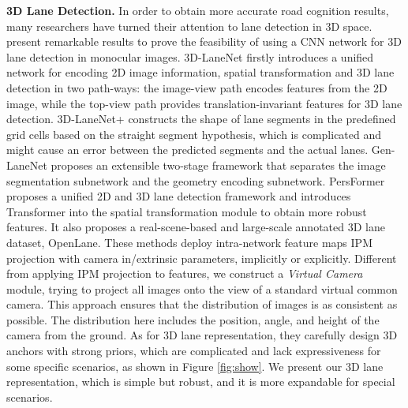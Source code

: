 \documentclass[10pt,twocolumn,letterpaper]{article}
\begin{document}
\textbf{3D Lane Detection.}
In order to obtain more accurate road cognition results, many researchers have turned their attention to lane detection in 3D space. \cite{garnett20193d,guo2020gen,chen2022persformer,li2022reconstruct} present remarkable results to prove the feasibility of using a CNN network for 3D lane detection in monocular images. 3D-LaneNet \cite{garnett20193d} firstly introduces a unified network for encoding 2D image information, spatial transformation and 3D lane detection in two path-ways: the image-view path encodes features from the 2D image, while the top-view path provides translation-invariant features for 3D lane detection. 3D-LaneNet+ \cite{efrat20203d} constructs the shape of lane segments in the predefined grid cells based on the straight segment hypothesis, which is complicated and might cause an error between the predicted segments and the actual lanes. Gen-LaneNet \cite{guo2020gen} proposes an extensible two-stage framework that separates the image segmentation subnetwork and the geometry encoding subnetwork. PersFormer \cite{chen2022persformer} proposes a unified 2D and 3D lane detection framework and introduces Transformer \cite{vaswani2017attention} into the spatial transformation module to obtain more robust features. It also proposes a real-scene-based and large-scale annotated 3D lane dataset, OpenLane. These methods deploy intra-network feature maps IPM projection with camera in/extrinsic parameters, implicitly or explicitly. Different from applying IPM projection to features, we construct a \textit{Virtual Camera} module, trying to project all images onto the view of a standard virtual common camera. This approach ensures that the distribution of images is as consistent as possible. The distribution here includes the position, angle, and height of the camera from the ground. As for 3D lane representation, they carefully design 3D anchors with strong priors, which are complicated and lack expressiveness for some specific scenarios, as shown in Figure \ref{fig:show}. We present our 3D lane representation, which is simple but robust, and it is more expandable for special scenarios.
\end{document}
